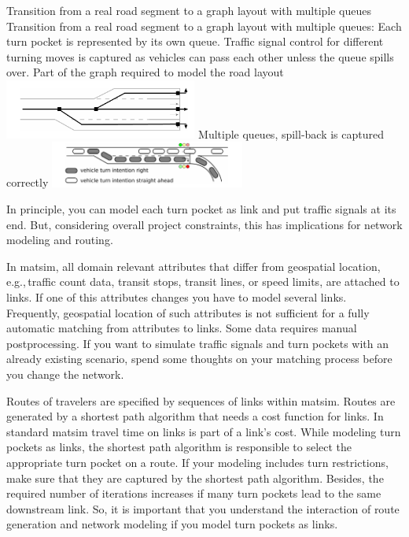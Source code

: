 \createfigure%
{Transition from a real road segment to a graph layout with multiple queues}%
{Transition from a real road segment to a graph layout with multiple queues: Each turn pocket is represented by its own queue. Traffic signal control for different turning moves is captured as vehicles can pass each other unless the queue spills over. }
{\label{fig:lanes_representation}}%
{%
  \createsubfigure%
	{Part of the graph required to model the road layout}
	{\includegraphics[width=0.475\textwidth]{extending/figures/signalslanes/link_lanes_layout}}
	{\label{fig:model_link_layout}}
  \createsubfigure%
	{Multiple queues, spill-back is captured correctly}%
	{\includegraphics[width=0.48\textwidth]{extending/figures/signalslanes/multiple_queue_model_inkscape.pdf}}%
	{\label{fig:lanes_representation_multiple_queue}}%
}%
{\citet{Grether2014PhD}}

In principle, you can model each turn pocket as link and put traffic signals at its end. 
But, considering overall project constraints, this has implications for network modeling and routing. 

In \gls{matsim}, all domain relevant attributes that differ from geospatial location, e.g.,\,traffic count data, transit stops, transit lines, or speed limits, are attached to links. 
If one of this attributes changes you have to model several links. 
Frequently, geospatial location of such attributes is not sufficient for a fully automatic matching from attributes to links. 
Some data requires manual postprocessing. 
If you want to simulate traffic signals and turn pockets with an already existing scenario, spend some thoughts on your matching process before you change the network.  

Routes of travelers are specified by sequences of links within \gls{matsim}. 
Routes are generated by a shortest path algorithm that needs a cost function for links. 
In standard \gls{matsim} travel time on links is part of a link's cost.
While modeling turn pockets as links, the shortest path algorithm is responsible to select the appropriate turn pocket on a route.
If your modeling includes turn restrictions, make sure that they are captured by the shortest path algorithm. 
Besides, the required number of iterations increases if many turn pockets lead to the same downstream link. 
So, it is important that you understand the interaction of route generation and network modeling if you model turn pockets as links. 

